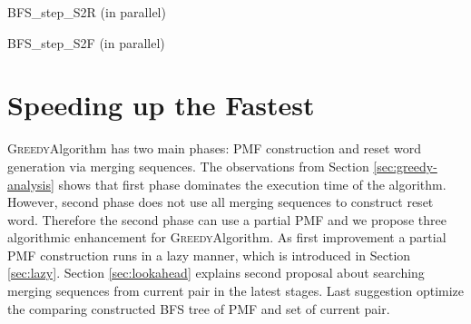 \documentclass[12pt]{article}
\newcommand{\comment}[2]{{\color{red}{\bf (#1: #2)}}}
\newcommand{\greedyAlgo}{\textsc{Greedy}}
\begin{document}
\begin{algorithm}[ht]
	\label{algo:BFS-step-S2R-Parallel}
	\caption{BFS\_step\_S2R (in parallel)}
	
	
	{
	}
	
\end{algorithm}

\begin{algorithm}[ht]
	\label{algo:BFS-step-S2F-Parallel}
	\caption{BFS\_step\_S2F (in parallel)}
	
	
		{
		}
\end{algorithm}

\clearpage
\section{Speeding up the Fastest}
\label{sec:speedup}
\comment{sertac}{Makalenin ismi guzel oldugu icin onu yazdim ama baska isim koymak gerekir mi emin olamadim.}

\greedyAlgo \space Algorithm has two main phases: PMF construction and reset word generation via merging sequences. The observations from Section \ref{sec:greedy-analysis} shows that first phase dominates the execution time of the algorithm. However, second phase does not use all merging sequences to construct reset word. Therefore the second phase can use a partial PMF and we propose three algorithmic enhancement for \greedyAlgo \space Algorithm. As first improvement a partial PMF construction runs in a lazy manner, which is introduced in Section \ref{sec:lazy}. Section \ref{sec:lookahead} explains second proposal about searching merging sequences from current pair in the latest stages. Last suggestion optimize the comparing constructed BFS tree of PMF and set of current pair.  
\end{document}
